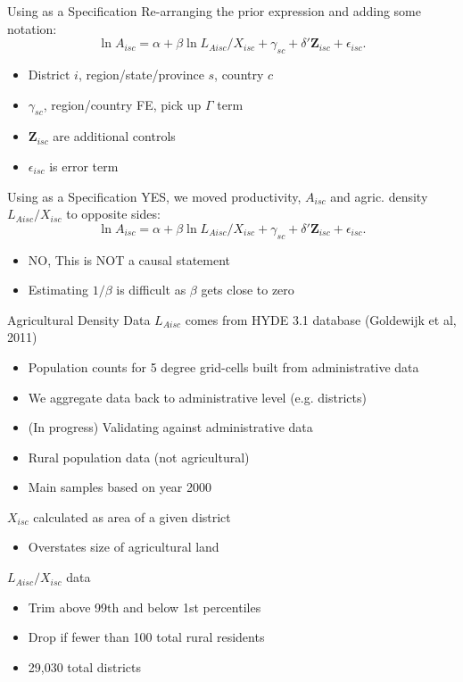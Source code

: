 \documentclass[10pt, xcolor=dvipsnames]{beamer}
\begin{document}
\begin{frame}{Using as a Specification}
Re-arranging the prior expression and adding some notation:
\begin{equation}
  \ln A_{isc} = \alpha + \beta \ln L_{Aisc}/X_{isc} + \gamma_{sc} + \delta' \mathbf{Z}_{isc} + \epsilon_{isc}. \label{EQ_regress}
\end{equation}

\begin{itemize}
  \item District $i$, region/state/province $s$, country $c$
  \item $\gamma_{sc}$, region/country FE, pick up $\Gamma$ term
  \item $\mathbf{Z}_{isc}$ are additional controls
  \item $\epsilon_{isc}$ is error term
\end{itemize}
\end{frame}

\begin{frame}{Using as a Specification}
YES, we moved productivity, $A_{isc}$ and agric. density $L_{Aisc}/X_{isc}$ to opposite sides:
\begin{equation}
  \ln A_{isc} = \alpha + \beta \ln L_{Aisc}/X_{isc} + \gamma_{sc} + \delta' \mathbf{Z}_{isc} + \epsilon_{isc}. \label{EQ_regress}
\end{equation}

\begin{itemize}
  \item NO, This is NOT a causal statement
  \item Estimating $1/\beta$ is difficult as $\beta$ gets close to zero
\end{itemize}
\end{frame}

\begin{frame}{Agricultural Density Data}
$L_{Aisc}$ comes from HYDE 3.1 database (Goldewijk et al, 2011)
\begin{itemize}
  \item Population counts for 5 degree grid-cells built from administrative data
  \item We aggregate data back to administrative level (e.g. districts)
  \item (In progress) Validating against administrative data
  \item Rural population data (not agricultural)
  \item Main samples based on year 2000
\end{itemize}
$X_{isc}$ calculated as area of a given district
\begin{itemize}
  \item Overstates size of agricultural land
\end{itemize}
$L_{Aisc}/X_{isc}$ data 
\begin{itemize}
  \item Trim above 99th and below 1st percentiles
  \item Drop if fewer than 100 total rural residents
  \item 29,030 total districts
\end{itemize}
\end{frame}
\end{document}
